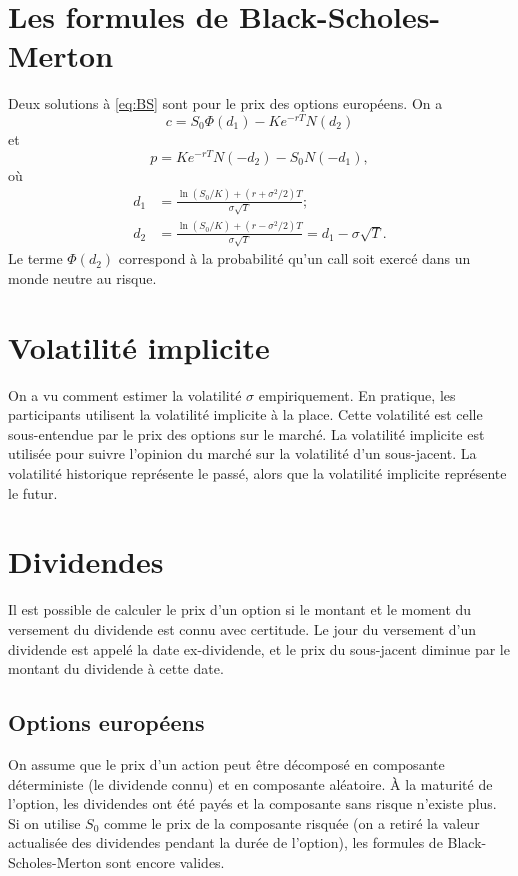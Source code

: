 \section{Les formules de Black-Scholes-Merton}

Deux solutions à \eqref{eq:BS} sont pour le prix des options européens. On a 
$$c = S_0 \Phi(d_1) - Ke^{-rT}N(d_2)$$
et
$$p = Ke^{-rT}N(-d_2) - S_0 N(-d_1),$$
où 
\begin{align*}
d_1 &= \frac{\ln(S_0 / K) + (r + \sigma^2/2)T}{\sigma \sqrt{T}} ;\\
d_2 &= \frac{\ln(S_0 / K) + (r - \sigma^2/2)T}{\sigma \sqrt{T}} = d_1 - \sigma \sqrt{T}.
\end{align*}
Le terme $\Phi(d_2)$ correspond à la probabilité qu'un call soit exercé dans un monde neutre au risque. 

\section{Volatilité implicite}

On a vu comment estimer la volatilité $\sigma$ empiriquement. En pratique, les participants utilisent la volatilité implicite à la place. Cette volatilité est celle sous-entendue par le prix des options sur le marché. La volatilité implicite est utilisée pour suivre l'opinion du marché sur la volatilité d'un sous-jacent. La volatilité historique représente le passé, alors que la volatilité implicite représente le futur. 

\section{Dividendes}

Il est possible de calculer le prix d'un option si le montant et le moment du versement du dividende est connu avec certitude. Le jour du versement d'un dividende est appelé la date ex-dividende, et le prix du sous-jacent diminue par le montant du dividende à cette date. 

\subsection{Options européens}

On assume que le prix d'un action peut être décomposé en composante déterministe (le dividende connu) et en composante aléatoire. À la maturité de l'option, les dividendes ont été payés et la composante sans risque n'existe plus. Si on utilise $S_0$ comme le prix de la composante risquée (on a retiré la valeur actualisée des dividendes pendant la durée de l'option), les formules de Black-Scholes-Merton sont encore valides. \\

